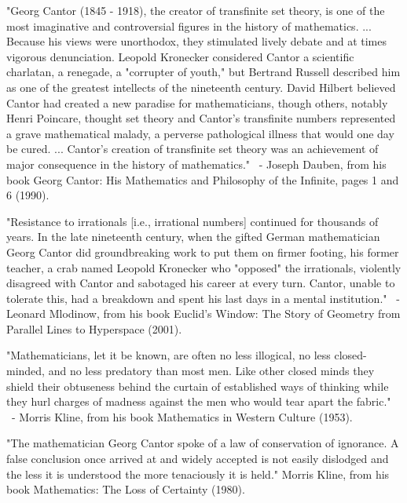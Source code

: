 \documentclass[12pt]{article}
\begin{document}
"Georg Cantor (1845 - 1918), the creator of transfinite set theory, is one of the most imaginative and controversial figures in the history of mathematics. ... Because his views were unorthodox, they stimulated lively debate and at times vigorous denunciation. Leopold Kronecker considered Cantor a scientific charlatan, a renegade, a "corrupter of youth," but Bertrand Russell described him as one of the greatest intellects of the nineteenth century. David Hilbert believed Cantor had created a new paradise for mathematicians, though others, notably Henri Poincare, thought set theory and Cantor's transfinite numbers represented a grave mathematical malady, a perverse pathological illness that would one day be cured. ... Cantor's creation of transfinite set theory was an achievement of major consequence in the history of mathematics."
 - Joseph Dauben, from his book Georg Cantor: His Mathematics and Philosophy of the Infinite, pages 1 and 6 (1990).

"Resistance to irrationals [i.e., irrational numbers] continued for thousands of years. In the late nineteenth century, when the gifted German mathematician Georg Cantor did groundbreaking work to put them on firmer footing, his former teacher, a crab named Leopold Kronecker who "opposed" the irrationals, violently disagreed with Cantor and sabotaged his career at every turn. Cantor, unable to tolerate this, had a breakdown and spent his last days in a mental institution."
 - Leonard Mlodinow, from his book Euclid's Window: The Story of Geometry from Parallel Lines to Hyperspace (2001).

"Mathematicians, let it be known, are often no less illogical, no less closed-minded, and no less predatory than most men. Like other closed minds they shield their obtuseness behind the curtain of established ways of thinking while they hurl charges of madness against the men who would tear apart the fabric."  
 - Morris Kline, from his book Mathematics in Western Culture (1953).

"The mathematician Georg Cantor spoke of a law of conservation of ignorance. A false conclusion once arrived at and widely accepted is not easily dislodged and the less it is understood the more tenaciously it is held."
Morris Kline, from his book Mathematics: The Loss of Certainty (1980).
\end{document}
